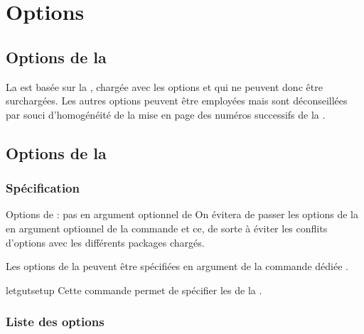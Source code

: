 \documentclass{letgut}
\begin{document}
\section{Options}
\label{sec:options}

\subsection{Options de la }
\label{sec:options-de-article}

La  est basée sur la , chargée avec les options
 et \docAuxKey{11pt} qui ne peuvent donc être
surchargées. Les autres options peuvent être employées mais sont déconseillées
par souci d'homogénéité de la mise en page des numéros successifs de la
.

\subsection{Options de la }
\label{sec:options-de-letgut}

\subsubsection{Spécification}
\label{sec:specification}

\begin{dbwarning}{Options de  : pas en argument optionnel
    de }{}
  On évitera de passer les options de la  en argument optionnel de
  la commande  et ce, de sorte à éviter les
  conflits d'options avec les différents packages chargés.
\end{dbwarning}

Les options de la  peuvent être spécifiées en argument de la
commande dédiée .

\begin{docCommand}{letgutsetup}{}
  Cette commande permet de spécifier les  de la .
\end{docCommand}

\subsubsection{Liste des options}
\label{sec:liste-des-options}
\end{document}
